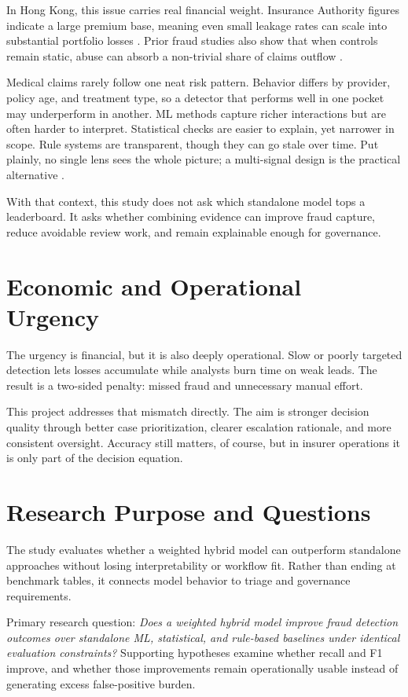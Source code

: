 \documentclass[12pt,a4paper]{report}
\begin{document}
In Hong Kong, this issue carries real financial weight. Insurance Authority figures indicate a large premium base, meaning even small leakage rates can scale into substantial portfolio losses \citep{ia2024}. Prior fraud studies also show that when controls remain static, abuse can absorb a non-trivial share of claims outflow \citep{caif2022}.

Medical claims rarely follow one neat risk pattern. Behavior differs by provider, policy age, and treatment type, so a detector that performs well in one pocket may underperform in another. ML methods capture richer interactions but are often harder to interpret. Statistical checks are easier to explain, yet narrower in scope. Rule systems are transparent, though they can go stale over time. Put plainly, no single lens sees the whole picture; a multi-signal design is the practical alternative \citep{chen2016,durtschi2004,subelj2011}.

With that context, this study does not ask which standalone model tops a leaderboard. It asks whether combining evidence can improve fraud capture, reduce avoidable review work, and remain explainable enough for governance.

\section{Economic and Operational Urgency}
The urgency is financial, but it is also deeply operational. Slow or poorly targeted detection lets losses accumulate while analysts burn time on weak leads. The result is a two-sided penalty: missed fraud and unnecessary manual effort.

This project addresses that mismatch directly. The aim is stronger decision quality through better case prioritization, clearer escalation rationale, and more consistent oversight. Accuracy still matters, of course, but in insurer operations it is only part of the decision equation.

\section{Research Purpose and Questions}
The study evaluates whether a weighted hybrid model can outperform standalone approaches without losing interpretability or workflow fit. Rather than ending at benchmark tables, it connects model behavior to triage and governance requirements.

Primary research question: \emph{Does a weighted hybrid model improve fraud detection outcomes over standalone ML, statistical, and rule-based baselines under identical evaluation constraints?} Supporting hypotheses examine whether recall and F1 improve, and whether those improvements remain operationally usable instead of generating excess false-positive burden.
\end{document}
